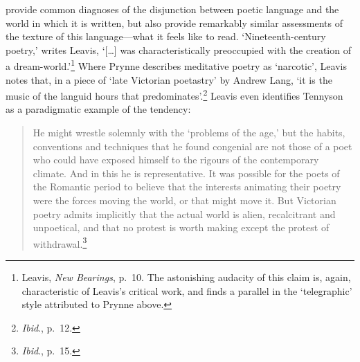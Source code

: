 \documentclass[]{article}
\begin{document}
provide common diagnoses of the disjunction between poetic language and
the world in which it is written, but also provide remarkably similar
assessments of the texture of this language—what it feels like to read.
‘Nineteenth-century poetry,’ writes Leavis, ‘{[}\ldots{}{]} was
characteristically preoccupied with the creation of a
dream-world.’\footnote{Leavis, \emph{New Bearings}, p.~10. The
  astonishing audacity of this claim is, again, characteristic of
  Leavis’s critical work, and finds a parallel in the ‘telegraphic’
  style attributed to Prynne above.} Where Prynne describes meditative
poetry as ‘narcotic’, Leavis notes that, in a piece of ‘late Victorian
poetastry’ by Andrew Lang, ‘it is the music of the languid hours that
predominates’.\footnote{\emph{Ibid}., p.~12.} Leavis even identifies
Tennyson as a paradigmatic example of the tendency:

\begin{quote}
\singlespacing He might wrestle solemnly with the ‘problems of the age,’
but the habits, conventions and techniques that he found congenial are
not those of a poet who could have exposed himself to the rigours of the
contemporary climate. And in this he is representative. It was possible
for the poets of the Romantic period to believe that the interests
animating their poetry were the forces moving the world, or that might
move it. But Victorian poetry admits implicitly that the actual world is
alien, recalcitrant and unpoetical, and that no protest is worth making
except the protest of withdrawal.\footnote{\emph{Ibid}., p.~15.}
\end{quote}
\end{document}
